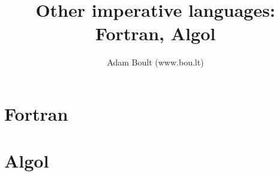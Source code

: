 \documentclass[oneside]{book}
\begin{document}
\author{Adam Boult (www.bou.lt)}
\title{Other imperative languages: Fortran, Algol}
\maketitle

\setcounter{tocdepth}{0}
\tableofcontents



\part{Fortran}


\part{Algol}

\end{document}
